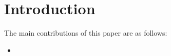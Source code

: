 \section{Introduction}









The main contributions of this paper are as follows:
\begin{itemize}
    \item 
\end{itemize}




 






